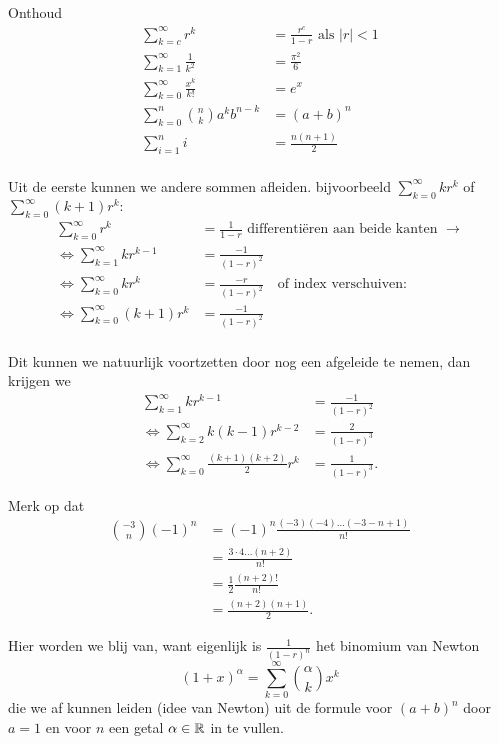Onthoud
\begin{align*}
    \sum_{k=c}^{\infty} r^k &= \frac{r^c}{1-r} \text{ als $|r|<1$}\\
    \sum_{k=1}^{\infty} \frac{1}{k^2} &= \frac{\pi^2}{6} \\
    \sum_{k=0}^\infty \frac{x^k}{k!} &= e^x \\
    \sum_{k=0}^n \binom{n}{k} a^k b^{n-k} &= (a+b)^n \\
    \sum_{i=1}^n i &= \frac{n(n+1)}{2} \\
\end{align*}

Uit de eerste kunnen we andere sommen afleiden.
bijvoorbeeld
$\displaystyle \sum_{k=0}^{\infty} kr^k $ of $\displaystyle \sum_{k=0}^{\infty} (k+1)r^k: $
\begin{align*}
    \sum_{k=0}^{\infty} r^k &= \frac{1}{1-r} \text { differenti\"eren aan beide kanten } \to \\
    \iff \sum_{k=1}^{\infty} kr^{k-1} &= \frac{-1}{(1-r)^2} \\
    \iff \sum_{k=0}^{\infty} kr^k &= \frac{-r}{(1-r)^2} \quad \text{of index verschuiven:} \\
    \iff \sum_{k=0}^{\infty} (k+1)r^k &= \frac{-1}{(1-r)^2} \\
\end{align*}

Dit kunnen we natuurlijk voortzetten door nog een afgeleide te nemen, dan krijgen we
\begin{align*}
    \sum_{k=1}^{\infty} kr^{k-1} &= \frac{-1}{(1-r)^2} \\
    \iff \sum_{k=2}^\infty k(k-1) r^{k-2} &= \frac{2}{(1-r)^3} \\
    \iff \sum_{k=0}^\infty \frac{(k+1)(k+2)}{2} r^k &= \frac{1}{(1-r)^3}.
\end{align*}

Merk op dat
\begin{align*}
    \binom{-3}{n} (-1)^n &= (-1)^n \frac{(-3)(-4)\dots (-3-n+1)}{n!} \\
    &= \frac{3 \cdot 4 \dots (n+2)}{n!} \\
    &= \frac{1}{2} \frac{(n+2)!}{n!} \\
    &= \frac{(n+2)(n+1)}{2}.
\end{align*}

Hier worden we blij van, want eigenlijk is $\frac{1}{(1-r)^n} $ het binomium van Newton
\[
    (1+x)^\alpha = \sum_{k=0}^\infty \binom{\alpha}{k} x^k
\]
die we af kunnen leiden (idee van Newton) uit de formule voor $(a+b)^n$ door $a=1$ en voor $n$ een getal $\alpha \in \mathbb{R}$ in te vullen.

